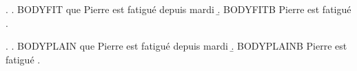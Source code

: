 

{\ExAnnotFit
\ex.
\a. BODYFIT que Pierre est fatigué depuis mardi\exannot{[Q1]}
\b. BODYFITB Pierre est fatigué\exannot{[Q2]}
\z.}

\ex.
\a. BODYPLAIN que Pierre est fatigué depuis mardi\exannot{[Q3]}
\b. BODYPLAINB Pierre est fatigué\exannot{[Q4]}
\z.

